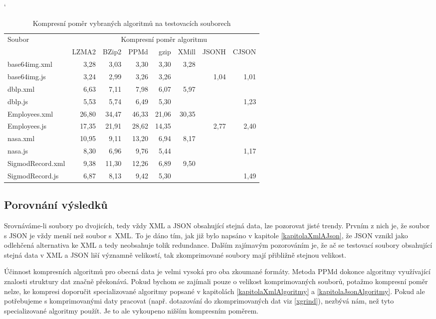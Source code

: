 \begin{table}[!h]
\catcode`
\centering
\begin{tabular}{|l|r|r|r|r|r|r|r|}
\hline
 \multirow{2}{*}{Soubor} & \multicolumn{7}{|c|}{Kompresní poměr algoritmu}\\
 \cline{2-8}
 & LZMA2 & BZip2 & PPMd & gzip & XMill & JSONH & CJSON\\
 \hline
 base64img.xml & 3,28 & 3,03 & 3,30 & 3,30 & 3,28 & & \\
 base64img.js & 3,24 & 2,99 & 3,26 & 3,26 & & 1,04 & 1,01\\
 \hline
 dblp.xml & 6,63 & 7,11 & 7,98 & 6,07 & 5,97 & & \\
 dblp.js & 5,53 & 5,74 & 6,49 & 5,30 & & & 1,23\\
 \hline
 Employees.xml & 26,80 & 34,47 & 46,33 & 21,06 & 30,35 & & \\
 Employees.js & 17,35 & 21,91 & 28,62 & 14,35 & & 2,77 & 2,40\\
 \hline
 nasa.xml & 10,95 & 9,11 & 13,20 & 6,94 & 8,17 & & \\
 nasa.js & 8,30 & 6,96 & 9,76 & 5,44 & & & 1,17\\
 \hline
 SigmodRecord.xml & 9,38 & 11,30 & 12,26 & 6,89 & 9,50 & & \\
 SigmodRecord.js & 6,87 & 8,13 & 9,42 & 5,30 & & & 1,49\\
\hline
\end{tabular}
\caption{Kompresní poměr vybraných algoritmů na testovacích souborech}
\label{tabulkaKompresniPomer}
\end{table}

\subsection{Porovnání výsledků}
Srovnáváme-li soubory po dvojicích, tedy vždy XML a JSON obsahující stejná data, lze pozorovat jisté trendy. Prvním z nich je, že soubor s JSON je vždy menší než soubor s~XML. To je dáno tím, jak již bylo napsáno v kapitole \ref{kapitolaXmlAJson}, že JSON vznikl jako odlehčená alternativa ke XML a tedy neobsahuje tolik redundance. Dalším zajímavým pozorováním je, že ač se testovací soubory obsahující stejná data v XML a JSON liší významně velikostí, tak zkomprimované soubory mají přibližně stejnou velikost.

Účinnost kompresních algoritmů pro obecná data je velmi vysoká pro oba zkoumané formáty. Metoda PPMd dokonce algoritmy využívající znalosti struktury dat značně pře\-ko\-ná\-vá. Pokud bychom se zajímali pouze o velikost komprimovaných souborů, potažmo kompresní poměr nelze, ke kompresi doporučit specializované algoritmy popsané v kapitolách \ref{kapitolaXmlAlgoritmy} a \ref{kapitolaJsonAlgoritmy}. Pokud ale potřebujeme s komprimovanými daty pracovat (např. dotazování do zkomprimovaných dat viz \ref{xgrind}), nezbývá nám, než tyto specializované algoritmy použít. Je to ale vykoupeno nižším kompresním poměrem.


